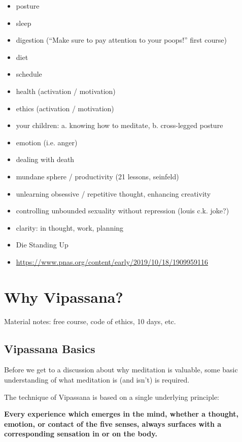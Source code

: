 \documentclass[a4paper, amsfonts, amssymb, amsmath, reprint, showkeys, nofootinbib, twoside]{revtex4-1}
\begin{document}
\begin{itemize}
  \item posture
  \item sleep
  \item digestion (``Make sure to pay attention to your poops!'' first course)
  \item diet
  \item schedule
  \item health (activation / motivation)
  \item ethics (activation / motivation)
  \item your children: a. knowing how to meditate, b. cross-legged posture
  \item emotion (i.e. anger)
  \item dealing with death
  \item mundane sphere / productivity (21 lessons, seinfeld)
  \item unlearning obsessive / repetitive thought, enhancing creativity
  \item controlling unbounded sexuality without repression (louis c.k. joke?)
  \item clarity: in thought, work, planning
  \item Die Standing Up
  \item \url{https://www.pnas.org/content/early/2019/10/18/1909959116}
\end{itemize}


\section{Why Vipassana?}

Material notes: free course, code of ethics, 10 days, etc.

\subsection{Vipassana Basics}

Before we get to a discussion about why meditation is valuable, some basic
understanding of what meditation is (and isn't) is required.

The technique of Vipassana is based on a single underlying principle:

\vspace{1cm}
\textbf{Every experience which emerges in the mind, whether a thought, emotion, or
  contact of the five senses, always surfaces with a corresponding sensation in or on the body.}
\vspace{1cm}
\end{document}
